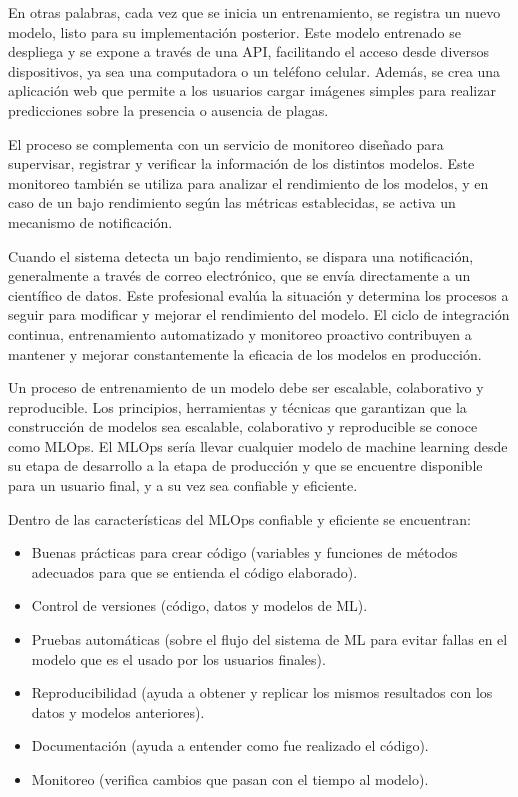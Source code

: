 \newpage

En otras palabras, cada vez que se inicia un entrenamiento, se registra un nuevo modelo, listo para su implementación posterior. Este modelo entrenado se despliega y se expone a través de una API, facilitando el acceso desde diversos dispositivos, ya sea una computadora o un teléfono celular. Además, se crea una aplicación web que permite a los usuarios cargar imágenes simples para realizar predicciones sobre la presencia o ausencia de plagas. \newline

El proceso se complementa con un servicio de monitoreo diseñado para supervisar, registrar y verificar la información de los distintos modelos. Este monitoreo también se utiliza para analizar el rendimiento de los modelos, y en caso de un bajo rendimiento según las métricas establecidas, se activa un mecanismo de notificación. \newline

Cuando el sistema detecta un bajo rendimiento, se dispara una notificación, generalmente a través de correo electrónico, que se envía directamente a un científico de datos. Este profesional evalúa la situación y determina los procesos a seguir para modificar y mejorar el rendimiento del modelo. El ciclo de integración continua, entrenamiento automatizado y monitoreo proactivo contribuyen a mantener y mejorar constantemente la eficacia de los modelos en producción. \newline

Un proceso de entrenamiento de un modelo debe ser escalable, colaborativo y reproducible. Los principios, herramientas y técnicas que garantizan que la construcción de modelos sea escalable, colaborativo y reproducible se conoce como MLOps. El MLOps sería llevar cualquier modelo de machine learning desde su etapa de desarrollo a la etapa de producción y que se encuentre disponible para un usuario final, y a su vez sea confiable y eficiente.

Dentro de las características del MLOps confiable y eficiente se encuentran:

\begin{itemize}
    \item Buenas prácticas para crear código (variables y funciones de métodos adecuados para que se entienda el código elaborado).
    \item Control de versiones (código, datos y modelos de ML).
    \item Pruebas automáticas (sobre el flujo del sistema de ML para evitar fallas en el modelo que es el usado por los usuarios finales).
    \item Reproducibilidad (ayuda a obtener y replicar los mismos resultados con los datos y modelos anteriores).
    \item Documentación (ayuda a entender como fue realizado el código).
    \item Monitoreo (verifica cambios que pasan con el tiempo al modelo).
\end{itemize}

